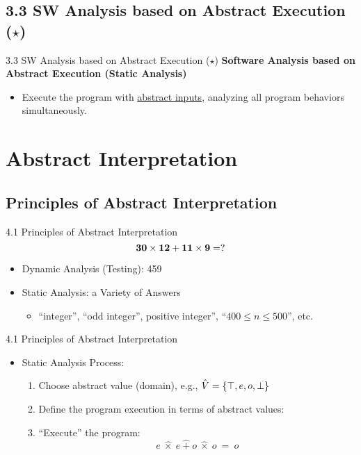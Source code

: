 \documentclass[10pt]{beamer}
\begin{document}
	\subsection{3.3 SW Analysis based on Abstract Execution ($\star$)}
	\begin{frame}{3.3 SW Analysis based on Abstract Execution ($\star$)}
		\textbf{Software Analysis based on Abstract Execution (Static Analysis)}
		\begin{itemize}
			\item Execute the program with \underline{abstract inputs}, analyzing all program behaviors simultaneously.
		\end{itemize}
	\end{frame}
	
	\section{Abstract Interpretation}
	\subsection{Principles of Abstract Interpretation}
	\begin{frame}{4.1 Principles of Abstract Interpretation}
		\[\bf
		30\times 12 + 11 \times 9 = ?
		\] \begin{itemize}
			\item Dynamic Analysis (Testing): 459
			\item Static Analysis: a Variety of Answers \begin{itemize}
				\item ``integer'', ``odd integer'', positive integer'', ``$400\leq n\leq 500$'', etc.
			\end{itemize}
		\end{itemize}
	\end{frame}
	\begin{frame}{4.1 Principles of Abstract Interpretation}
		\begin{itemize}
			\item Static Analysis Process:
			\begin{enumerate}
				\item Choose abstract value (domain), e.g., $\hat{V}=\set{\top,e,o,\bot}$
				\item Define the program execution in terms of abstract values:
				\item ``Execute'' the program: \[
				e\ \hat{\times}\ e\ \hat{+}\ o\ \hat{\times}\ o\ =\ o
				\]
			\end{enumerate}
		\end{itemize}
	\end{frame}
	
\end{document}
